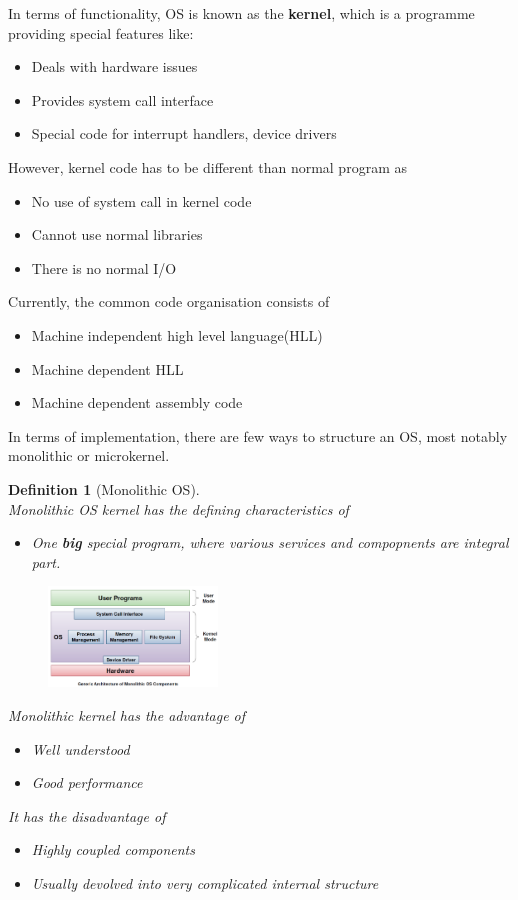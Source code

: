 \documentclass[12pt]{article}
\newtheorem{definition}{Definition}[section]
\theoremstyle{definition}
\begin{document}
In terms of functionality, OS is known as the \textbf{kernel}, which is a programme providing special features like:
\begin{itemize}
  \item Deals with hardware issues
  \item Provides system call interface
  \item Special code for interrupt handlers, device drivers
\end{itemize}
However, kernel code has to be different than normal program as
\begin{itemize}
  \item No use of system call in kernel code
  \item Cannot use normal libraries
  \item There is no normal I/O
\end{itemize}
Currently, the common code organisation consists of
\begin{itemize}
  \item Machine independent high level language(HLL)
  \item Machine dependent HLL
  \item Machine dependent assembly code
\end{itemize}
In terms of implementation, there are few ways to structure an OS, most notably monolithic or microkernel.
\begin{definition}[Monolithic OS]
\hfill\\\normalfont Monolithic OS kernel has the defining characteristics of
\begin{itemize}
  \item One \textbf{big} special program, where various services and compopnents are integral part.
\end{itemize}
\begin{figure}[h]
\centering
\includegraphics[width = 0.4\textwidth]{1_6.png}
\end{figure}
Monolithic kernel has the advantage of
\begin{itemize}
  \item Well understood
  \item Good performance
\end{itemize}
It has the disadvantage of
\begin{itemize}
  \item Highly coupled components
  \item Usually devolved into very complicated internal structure
\end{itemize}
\end{definition}
\end{document}
